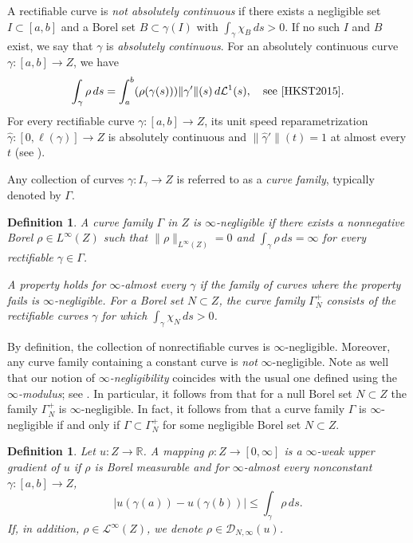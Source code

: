 \documentclass[reqno]{amsart}
\numberwithin{equation}{section}
\newtheorem{definition}[theorem]{Definition}
\theoremstyle{remark}
\begin{document}
A rectifiable curve is \emph{not absolutely continuous} if there exists a negligible set $I \subset \left[a,b\right]$ and a Borel set $B \subset \gamma( I )$ with $\int_{\gamma} \chi_{B} \,ds > 0$. If no such $I$ and $B$ exist, we say that $\gamma$ is \emph{absolutely continuous}. For an absolutely continuous curve $\gamma \colon \left[a,b\right] \rightarrow Z$, we have
\begin{equation*}
    \label{eq:curveintegral:ABS}
    \int_{\gamma} \rho \,ds
    =
    \int_{ a }^{ b }
        ( \rho( \gamma(s) ) ) \| \gamma' \|(s)
    \,d\mathcal{L}^{1}(s),
    \quad\text{see \cite[Section 5.1]{HKST2015}}.
\end{equation*}
For every rectifiable curve $\gamma\colon[a,b]\to Z$, its unit speed reparametrization $\widehat \gamma\colon[0,\ell(\gamma)]\to  Z$ is absolutely continuous and $\|\widehat \gamma '\|(t)=1$ at almost every $t$ (see \cite[Proposition 5.1.8]{HKST2015}).


Any collection of curves $\gamma \colon I_{\gamma} \rightarrow Z$ is referred to as a \emph{curve family}, typically denoted by $\Gamma$.
\begin{definition}\label{de:negligible}
A curve family $\Gamma$ in $Z$ is \emph{$\infty$-negligible} if there exists a nonnegative Borel $\rho \in L^{\infty}( Z )$ such that $\| \rho \|_{ L^{\infty}(Z) }= 0$ and $\int_{\gamma} \rho \,ds = \infty$ for every rectifiable $\gamma \in \Gamma$.

A property holds for \emph{$\infty$-almost every} $\gamma$ if the family of curves where the property fails is $\infty$-negligible. For a Borel set $N \subset Z$, the curve family $\Gamma_{N}^{+}$ consists of the rectifiable curves $\gamma$ for which $\int_{\gamma} \chi_{N}\,ds > 0$.
\end{definition}
By definition, the collection of nonrectifiable curves is $\infty$-negligible. Moreover, any curve family containing a constant curve is \emph{not} $\infty$-negligible. Note as well that our notion of \emph{$\infty$-negligibility} coincides with the usual one defined using the \emph{$\infty$-modulus}; see \cite[Lemma 5.7]{Durand}. In particular, it follows from  that for a null Borel set $N\subset Z$ the family $\Gamma^+_N$ is $\infty$-negligible. In fact, it follows from  that a curve family $\Gamma$ is $\infty$-negligible if and only if $\Gamma \subset \Gamma^{+}_{N}$ for some negligible Borel set $N \subset Z$.

\begin{definition}
Let $u \colon Z \rightarrow \mathbb{R}$. A mapping $\rho \colon Z \rightarrow [0,\infty]$ is a \emph{$\infty$-weak upper gradient} of $u$ if $\rho$ is Borel measurable and for $\infty$-almost every nonconstant $\gamma \colon \left[a,b\right] \rightarrow Z$,
\begin{equation}\label{eq:boundaryinequality}
    |u( \gamma(a) ) - u( \gamma(b) )|
    \leq
    \int_{\gamma} \rho \,ds.
\end{equation}
If, in addition, $\rho \in \mathcal L^\infty(Z)$, we denote $\rho \in \mathcal{D}_{N,\infty}(u)$.
\end{definition}
\end{document}
